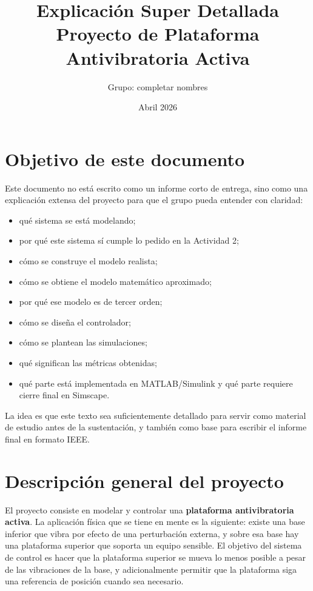 \documentclass[11pt]{article}
\title{Explicaci\'on Super Detallada\\Proyecto de Plataforma Antivibratoria Activa}
\author{Grupo: completar nombres}
\date{Abril 2026}
\begin{document}
\maketitle
\tableofcontents
\newpage

\section{Objetivo de este documento}

Este documento no est\'a escrito como un informe corto de entrega, sino como una explicaci\'on extensa del proyecto para que el grupo pueda entender con claridad:

\begin{itemize}[leftmargin=1.2cm]
\item qu\'e sistema se est\'a modelando;
\item por qu\'e este sistema s\'i cumple lo pedido en la Actividad 2;
\item c\'omo se construye el modelo realista;
\item c\'omo se obtiene el modelo matem\'atico aproximado;
\item por qu\'e ese modelo es de tercer orden;
\item c\'omo se dise\~na el controlador;
\item c\'omo se plantean las simulaciones;
\item qu\'e significan las m\'etricas obtenidas;
\item qu\'e parte est\'a implementada en MATLAB/Simulink y qu\'e parte requiere cierre final en Simscape.
\end{itemize}

La idea es que este texto sea suficientemente detallado para servir como material de estudio antes de la sustentaci\'on, y tambi\'en como base para escribir el informe final en formato IEEE.

\section{Descripci\'on general del proyecto}

El proyecto consiste en modelar y controlar una \textbf{plataforma antivibratoria activa}. La aplicaci\'on f\'isica que se tiene en mente es la siguiente: existe una base inferior que vibra por efecto de una perturbaci\'on externa, y sobre esa base hay una plataforma superior que soporta un equipo sensible. El objetivo del sistema de control es hacer que la plataforma superior se mueva lo menos posible a pesar de las vibraciones de la base, y adicionalmente permitir que la plataforma siga una referencia de posici\'on cuando sea necesario.
\end{document}
